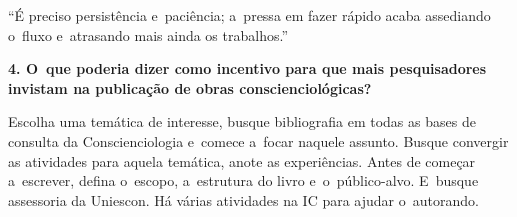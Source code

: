 \documentclass{gescons}
\begin{document}
\begin{multicols}{2}
\begin{pullquote}
    ``É preciso persistência e~paciência; a~pressa em fazer rápido acaba assediando o~fluxo e~atrasando mais ainda os trabalhos.''
\end{pullquote}

\textbf{4.       O~que poderia dizer como incentivo para que mais pesquisadores invistam na publicação de obras conscienciológicas?}

Escolha uma temática de interesse, busque bibliografia em todas as bases de consulta da Conscienciologia e~comece a~focar naquele assunto. Busque convergir as atividades para aquela temática, anote as experiências. Antes de começar a~escrever, defina o~escopo, a~estrutura do livro e~o~público-alvo. E~busque assessoria da Uniescon. Há várias atividades na IC para ajudar o~autorando. 
    
    
    \end{multicols}
\end{document}
